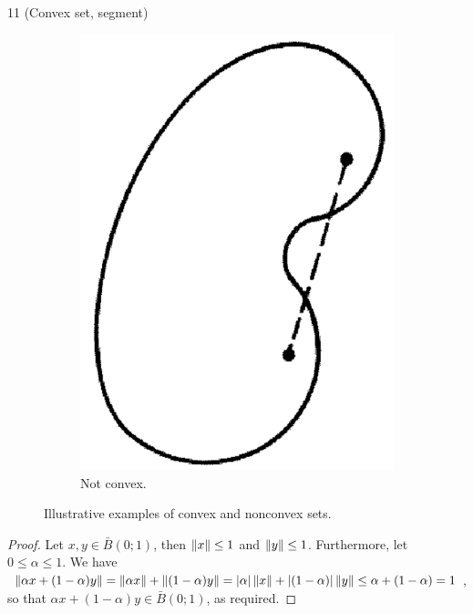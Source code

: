 \begin{exercise}{11 (Convex set, segment)}
\begin{figure}[H]
\begin{subfigure}[b]{0.45\textwidth}
         \includegraphics[width=\textwidth]{kreyszig/assets/sec2-2-ex11-b.png}
         \caption{Not convex.}
         \label{fig:sec2-2-ex11-b}
     \end{subfigure}
     \hfill
    \caption{Illustrative examples of convex and nonconvex sets.}
    \label{fig:sec2-2-ex11}
\end{figure}
\end{exercise}
\begin{proof}
Let $x,y\in\bar{B}(0;1)$, then $\left\lVert x\right\rVert\leq 1$ and $\left\lVert y\right\rVert\leq 1$. Furthermore, let $0\leq\alpha\leq 1$. We have $\left\lVert \alpha x+(1-\alpha)y\right\rVert =\left\lVert \alpha x\right\rVert+\left\lVert (1-\alpha)y\right\rVert =\left\lvert \alpha\right\rvert\left\lVert x\right\rVert+\left\lvert (1-\alpha)\right\rvert\left\lVert y\right\rVert\leq \alpha+(1-\alpha)=1$, so that $\alpha x+(1-\alpha)y\in\bar{B}(0;1)$, as required.
\end{proof}

